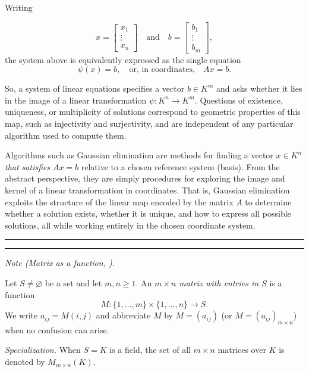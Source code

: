 \medskip

Writing

\[
x =
\begin{bmatrix}
x_1\\
\vdots\\
x_n
\end{bmatrix}
\quad\text{and}\quad
b =
\begin{bmatrix}
b_1\\
\vdots\\
b_m
\end{bmatrix},
\]
the system above is equivalently expressed as the single equation
\[
\psi(x) = b,
\quad\text{or, in coordinates,}\quad
A x = b.
\]

So, a system of linear equations specifies a vector
\(
b \in K^m
\)
and asks whether it lies in the image of a linear transformation
\(
\psi : K^n \to K^m.
\)
Questions of existence, uniqueness, or multiplicity of solutions correspond to geometric properties of this map, such as injectivity and surjectivity, and are independent of any particular algorithm used to compute them.

\medskip

Algorithms such as Gaussian elimination are methods for finding a vector
\(
x \in K^n
\)
\textit{that satisfies}
\(
A x = b
\)
relative to a chosen reference system (basis). From the abstract perspective, they are simply procedures for exploring the image and kernel of a linear transformation in coordinates. That is, Gaussian elimination exploits the structure of the linear map encoded by the matrix \(A\) to determine whether a solution exists, whether it is unique, and how to express all possible solutions, all while working entirely in the chosen coordinate system.

\medskip
\hrule
\bigskip

\bigskip
\hrule
\medskip

\textit{Note (Matrix as a function, \cite{iribarren}).}

\medskip

Let $S\neq\varnothing$ be a set and let $m,n\ge 1$.
An \emph{$m\times n$ matrix with entries in $S$} is a function
\[
M:\{1,\dots,m\}\times\{1,\dots,n\}\longrightarrow S.
\]
We write $a_{ij}=M(i,j)$ and abbreviate $M$ by $M=(a_{ij})$ (or $M=(a_{ij})_{m\times n}$) when no confusion can arise.

\medskip

\textit{Specialization.}
When $S=K$ is a field, the set of all $m\times n$ matrices over $K$ is denoted by $M_{m\times n}(K)$.

